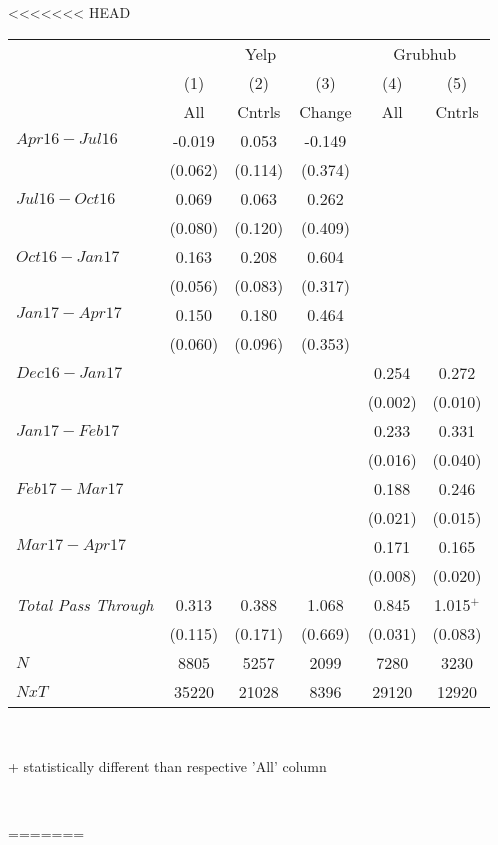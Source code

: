 <<<<<<< HEAD
\begin{center}
\begin{tabular}{lccccc}
\hline  & \multicolumn{3}{c}{Yelp} & \multicolumn{2}{c}{Grubhub}\\
 & (1) & (2) & (3) & (4) & (5)\\
 & All & Cntrls & Change & All & Cntrls\\
\hline  $ Apr16-Jul16 $  & -0.019 & 0.053 & -0.149 &  & \\
 & (0.062) & (0.114) & (0.374) &  & \\
 $ Jul16-Oct16 $  & 0.069 & 0.063 & 0.262 &  & \\
 & (0.080) & (0.120) & (0.409) &  & \\
 $ Oct16-Jan17 $  & 0.163 & 0.208 & 0.604 &  & \\
 & (0.056) & (0.083) & (0.317) &  & \\
 $ Jan17-Apr17 $  & 0.150 & 0.180 & 0.464 &  & \\
 & (0.060) & (0.096) & (0.353) &  & \\
\hline  $ Dec16-Jan17 $  &  &  &  & 0.254 & 0.272\\
 &  &  &  & (0.002) & (0.010)\\
 $ Jan17-Feb17 $  &  &  &  & 0.233 & 0.331\\
 &  &  &  & (0.016) & (0.040)\\
 $ Feb17-Mar17 $  &  &  &  & 0.188 & 0.246\\
 &  &  &  & (0.021) & (0.015)\\
 $ Mar17-Apr17 $  &  &  &  & 0.171 & 0.165\\
 &  &  &  & (0.008) & (0.020)\\
\hline \textit{Total Pass Through} & 0.313 & 0.388 & 1.068 & 0.845 & 1.015$^+$\\
  & (0.115) & (0.171) & (0.669) & (0.031) & (0.083)\\
\hline  $ N $  & 8805 & 5257 & 2099 & 7280 & 3230\\
 $ NxT $  & 35220 & 21028 & 8396 & 29120 & 12920\\
\hline\end{tabular}\\
\begin{tiny}+ statistically different than respective 'All' column \end{tiny}\\
\end{center}
=======
